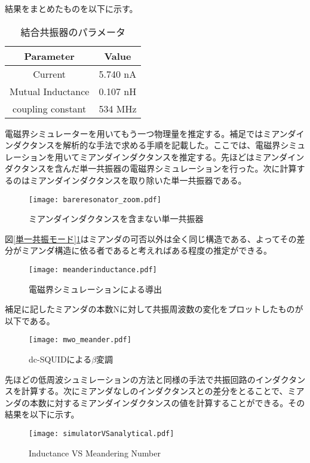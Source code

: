         結果をまとめたものを以下に示す。
        \begin{table}[H]
            \caption{結合共振器のパラメータ}
            \centering
            \begin{tabular}{@{}cc@{}}
            \toprule
            Parameter & Value    \\ 
            \hline \hline
            Current        & 5.740 nA \\
            Mutual Inductance       & 0.107 nH \\ 
            coupling constant         & 534 MHz  \\\bottomrule
            \end{tabular}
        \end{table}
        電磁界シミュレーターを用いてもう一つ物理量を推定する。補足ではミアンダインダクタンスを解析的な手法で求める手順を記載した。ここでは、電磁界シミュレーションを用いてミアンダインダクタンスを推定する。先ほどはミアンダインダクタンスを含んだ単一共振器の電磁界シミュレーションを行った。次に計算するのはミアンダインダクタンスを取り除いた単一共振器である。
        \begin{figure}[H]
            \centering
            \texttt{[image: bareresonator\_zoom.pdf]}
            \caption{ミアンダインダクタンスを含まない単一共振器}
            \label{ミアンダなし}
        \end{figure}
        図\ref*{単一共振モード}\ref*{ミアンダなし}はミアンダの可否以外は全く同じ構造である、よってその差分がミアンダ構造に依る者であると考えればある程度の推定ができる。
        \begin{figure}[H]
            \centering
            \texttt{[image: meanderinductance.pdf]}
            \caption{電磁界シミュレーションによる導出}
        \end{figure}
        補足に記したミアンダの本数Nに対して共振周波数の変化をプロットしたものが以下である。
        \begin{figure}[H]
            \centering
            \texttt{[image: mwo\_meander.pdf]}
            \caption{dc-SQUIDによる$\beta$変調}
        \end{figure}
        先ほどの低周波シュミレーションの方法と同様の手法で共振回路のインダクタンスを計算する。次にミアンダなしのインダクタンスとの差分をとることで、ミアンダの本数に対するミアンダインダクタンスの値を計算することができる。その結果を以下に示す。
        \begin{figure}[H]
            \centering
            \texttt{[image: simulatorVSanalytical.pdf]}
            \caption{Inductance VS Meandering Number}
            \label{ミアンダmwovs}
        \end{figure}

